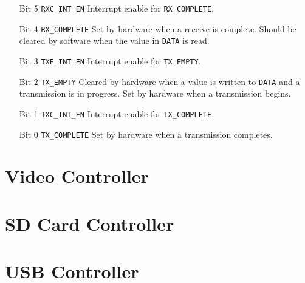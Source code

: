 \documentclass[11pt,openany]{report}
\begin{document}
\begin{enumerate}
\item[Bit 5] \verb|RXC_INT_EN| Interrupt enable for \verb|RX_COMPLETE|.
\item[Bit 4] \verb|RX_COMPLETE| Set by hardware when a receive is
  complete. Should be cleared by software when the value in
  \verb|DATA| is read.
\item[Bit 3] \verb|TXE_INT_EN| Interrupt enable for \verb|TX_EMPTY|.
\item[Bit 2] \verb|TX_EMPTY| Cleared by hardware when a value is
  written to \verb|DATA| and a transmission is in progress. Set by
  hardware when a transmission begins.
\item[Bit 1] \verb|TXC_INT_EN| Interrupt enable for \verb|TX_COMPLETE|.
\item[Bit 0] \verb|TX_COMPLETE| Set by hardware when a transmission
  completes.
\end{enumerate}


\section{Video Controller}

\section{SD Card Controller}

\section{USB Controller}
\end{document}
